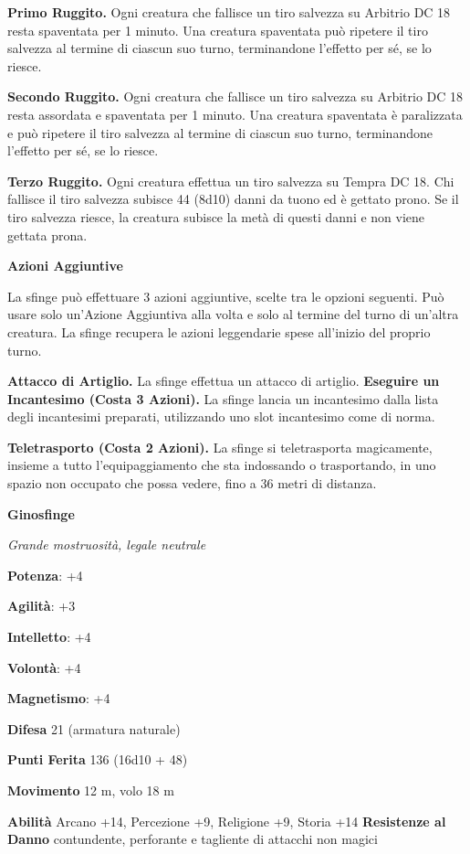\begin{multicols}{2}
\textbf{Primo Ruggito.} Ogni creatura che fallisce un tiro salvezza su Arbitrio DC 18 resta spaventata per 1 minuto. Una creatura spaventata
può ripetere il tiro salvezza al termine di ciascun suo turno,
terminandone l'effetto per sé, se lo riesce.

\textbf{Secondo Ruggito.} Ogni creatura che fallisce un tiro salvezza su Arbitrio DC 18 resta assordata e spaventata per 1 minuto. Una creatura
spaventata è paralizzata e può ripetere il tiro salvezza al termine di
ciascun suo turno, terminandone l'effetto per sé, se lo riesce.

\textbf{Terzo Ruggito.} Ogni creatura effettua un tiro salvezza su Tempra DC 18. Chi fallisce il tiro salvezza subisce 44 (8d10)
danni da tuono ed è gettato prono. Se il tiro salvezza riesce, la
creatura subisce la metà di questi danni e non viene gettata prona.

\textbf{Azioni Aggiuntive}

La sfinge può effettuare 3 azioni aggiuntive, scelte tra le opzioni
seguenti. Può usare solo un'Azione Aggiuntiva alla volta e solo al
termine del turno di un'altra creatura. La sfinge recupera le azioni
leggendarie spese all'inizio del proprio turno.

\textbf{Attacco di Artiglio.} La sfinge effettua un attacco di artiglio.
\textbf{Eseguire un Incantesimo (Costa 3 Azioni).} La sfinge lancia un
incantesimo dalla lista degli incantesimi preparati, utilizzando uno
slot incantesimo come di norma.

\textbf{Teletrasporto (Costa 2 Azioni).} La sfinge si teletrasporta
magicamente, insieme a tutto l'equipaggiamento che sta indossando o
trasportando, in uno spazio non occupato che possa vedere, fino a 36
metri di distanza.


\textbf{Ginosfinge}

\emph{Grande mostruosità, legale neutrale}

\textbf{Potenza}: +4

\textbf{Agilità}: +3

\textbf{Intelletto}: +4

\textbf{Volontà}: +4

\textbf{Magnetismo}: +4

\textbf{Difesa} 21 (armatura naturale)

\textbf{Punti Ferita} 136 (16d10 + 48)

\textbf{Movimento} 12 m, volo 18 m

\textbf{Abilità} Arcano +14, Percezione +9, Religione +9, Storia +14
\textbf{Resistenze al Danno} contundente, perforante e tagliente di
attacchi non magici


\end{multicols}
